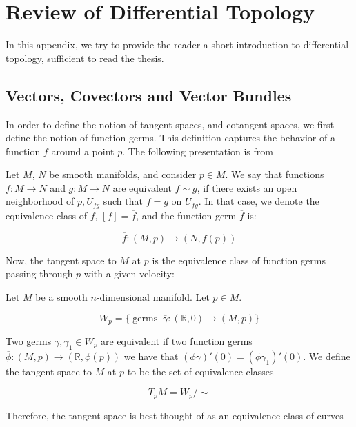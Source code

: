 
\section{Review of Differential Topology}

In this appendix, we try to provide the reader a short introduction to differential topology, sufficient to read the thesis. 

\subsection{Vectors, Covectors and Vector Bundles}

In order to define the notion of tangent spaces, and cotangent spaces, we first define the notion of function germs. This definition captures the behavior of a function $f$ around a point $p$. The following presentation is from \textcite{Bjorn2018}

\begin{defn}

Let $M$, $N$ be smooth manifolds, and consider $p \in M$. We say that functions $f: M \to N$ and $g: M \to N$ are equivalent $f \sim g$, if there exists an open neighborhood of $p, U_{fg}$ such that $f = g$ on $U_{fg}$. In that case, we denote the equivalence class of $f$, $[f] = \overline{f}$, and the function germ $\overline{f}$ is:

$$\overline{f}: (M, p) \to (N, f(p))$$
\end{defn}

\noindent Now, the tangent space to $M$ at $p$ is the equivalence class of function germs passing through $p$ with a given velocity:

\begin{defn}
Let $M$ be a smooth $n$-dimensional manifold. Let $p \in M$. 

$$W_{p} = \{\operatorname{germs } \; \overline{\gamma}: (\mathbb{R}, 0) \to (M, p) \}$$

\noindent Two germs $\overline{\gamma}, \overline{\gamma}_{1} \in W_{p}$ are equivalent if two function germs $\overline{\phi}: (M, p) \to (\mathbb{R}, \phi(p))$ we have that $(\phi \gamma)'(0) = (\phi \gamma_{1})'(0)$. We define the tangent space to $M$ at $p$ to be the set of equivalence classes 

$$T_{p} M = W_{p}/\sim $$
\end{defn}

\begin{remark}
Therefore, the tangent space is best thought of as an equivalence class of curves
\end{remark}


